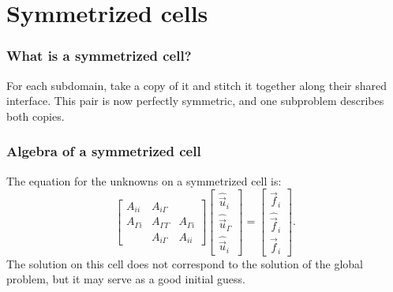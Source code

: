 \documentclass{beamer}
\begin{document}
\section{Symmetrized cells}

\begin{frame}
\frametitle{What is a symmetrized cell?}

For each subdomain, take a copy of it and stitch it together along their shared interface.
This pair is now perfectly symmetric, and one subproblem describes both copies.

\end{frame}

\begin{frame}
\frametitle{Algebra of a symmetrized cell}

The equation for the unknowns on a symmetrized cell is:
\begin{equation} \label{eq: sym cell}
	\begin{bmatrix}
		A_{ii} & A_{i \Gamma} \\
		A_{\Gamma i} & A_{\Gamma \Gamma} & A_{\Gamma i} \\
		& A_{i \Gamma} & A_{ii}
	\end{bmatrix}
	\begin{bmatrix} \hat{\vec{u}}_i \\ \hat{\vec{u}}_\Gamma \\ \hat{\vec{u}}_i \end{bmatrix}
	=
	\begin{bmatrix} \vec{f}_i \\ \hat{\vec{f}}_i \\ \vec{f}_i \end{bmatrix}.
\end{equation}
The solution on this cell does not correspond to the solution of the global problem, but it may serve as a good initial guess.
\end{frame}
\end{document}
